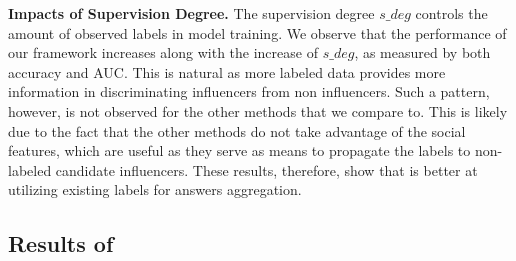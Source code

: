 \smallskip
\noindent\textbf{Impacts of Supervision Degree.} The supervision degree $s\_deg$ controls the amount of observed labels in model training. We observe that the performance of our framework increases along with the increase of $s\_deg$, as measured by both accuracy and AUC. This is natural as more labeled data provides more information in discriminating influencers from non influencers. Such a pattern, however, is not observed for the other methods that we compare to. This is likely due to the fact that the other methods do not take advantage of the social features, which are useful as they serve as means to propagate the labels to non-labeled candidate influencers. These results, therefore, show that \sys is better at utilizing existing labels for answers aggregation. 

\subsection{Results of \sys}
\label{sec:selfres}

